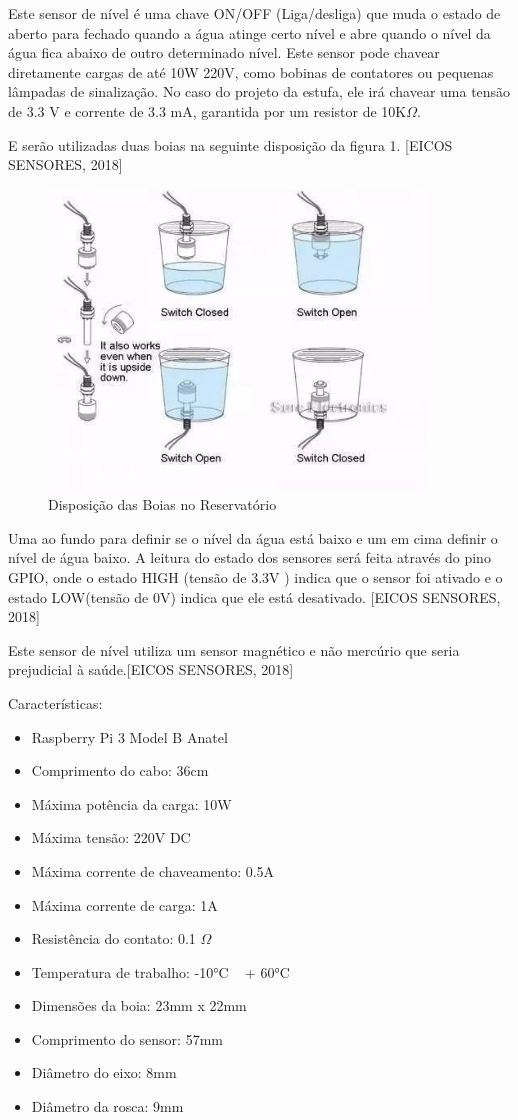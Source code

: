 Este sensor de nível é uma chave ON/OFF (Liga/desliga) que muda o estado de aberto para fechado quando a água atinge certo nível e abre quando o nível da água fica abaixo de outro determinado nível. Este sensor pode chavear diretamente cargas de até 10W 220V, como bobinas de contatores ou pequenas lâmpadas de sinalização. No caso do projeto da estufa, ele irá chavear uma tensão de 3.3 V e corrente de 3.3 mA, garantida por um resistor de 10K$\Omega$. 

E serão utilizadas duas boias na seguinte disposição da figura 1. [EICOS SENSORES, 2018]

\begin{figure}[H]
	\centering
	\includegraphics[width=10cm]{figuras/eletronica_1.png}
	\caption{Disposição das Boias no Reservatório} \label{eletronica_1}
\end{figure}

Uma ao fundo para definir se o nível da água está baixo e um em cima definir o nível de água baixo.  A leitura do estado dos sensores será feita através do pino GPIO, onde o estado HIGH (tensão de 3.3V ) indica que o sensor foi ativado e o estado LOW(tensão de 0V) indica que ele está desativado. [EICOS SENSORES, 2018]

Este sensor de nível utiliza um sensor magnético e não mercúrio que seria prejudicial à saúde.[EICOS SENSORES, 2018]

Características:

\begin{itemize}
	\item Raspberry Pi 3 Model B Anatel
	\item Comprimento do cabo: 36cm
	\item Máxima potência da carga: 10W
	\item Máxima tensão: 220V DC
	\item Máxima corrente de chaveamento: 0.5A
	\item Máxima corrente de carga: 1A
	\item Resistência do contato: 0.1 $\Omega$
	\item Temperatura de trabalho: -10°C ~ + 60°C
	\item Dimensões da boia: 23mm x 22mm
	\item Comprimento do sensor: 57mm
	\item Diâmetro do eixo: 8mm
	\item Diâmetro da rosca: 9mm
\end{itemize}

